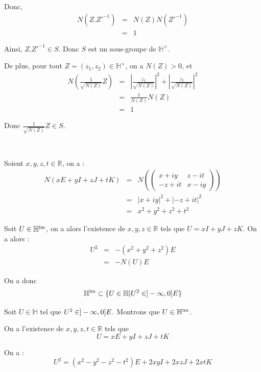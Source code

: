 Donc,
\begin{eqnarray*}
  N \left( {Z.Z'}^{- 1} \right) & = & N (Z) N \left( {Z'}^{- 1} \right)\\
  & = & 1
\end{eqnarray*}


Ainsi, ${Z.Z'}^{- 1} \in S$. Donc $S$ est un sous-groupe de
$\mathbb{H}^{\times}$.

De plus, pour tout $Z = (z_1, z_2) \in \mathbb{H}^{\times}$, on a $N (Z) > 0$,
et
\begin{eqnarray*}
  N \left( \frac{1}{\sqrt{N (Z)}} Z \right) & = & \left| \frac{z_1}{\sqrt{N
  (Z)}} \right|^2 + \left| \frac{z_2}{\sqrt{N (Z)}} \right|^2\\
  & = & \frac{1}{N (Z)} N (Z)\\
  & = & 1
\end{eqnarray*}


Donc $\frac{1}{\sqrt{N (Z)}} Z \in S$.

\

 Soient $x, y, z, t \in \mathbb{R}$, on a :
\begin{eqnarray*}
  N (x E + y I + z J + t K) & = & N \left( \left(\begin{array}{cc}
    x + i y & z - i t\\
    - z + i t & x - i y
  \end{array}\right) \right)\\
  & = & | x + i y |^2 + | - z + i t |^2\\
  & = & x^2 + y^2 + z^2 + t^2
\end{eqnarray*}


 Soit $U \in \mathbb{H}^{\operatorname{im}}$, on a alors l'existence de
$x, y, z \in \mathbb{R}$ tels que $U = x I + y J + z K$. On a alors :
\begin{eqnarray*}
  U^2 & = & - (x^2 + y^2 + z^2) E\\
  & = & - N (U) E
\end{eqnarray*}


On a donc
\[ \mathbb{H}^{\operatorname{im}} \subset \{  U \in \mathbb{H} | U^2 \in] -
   \infty, 0] E \} \]


Soit $U \in \mathbb{H}$ tel que $  U^2 \in] - \infty, 0]
E$. Montrons que $U \in \mathbb{H}^{\operatorname{im}}$.

On a l'existence de $x, y, z, t \in \mathbb{R}$ tels que
\[ U = x E + y I + z J + t K \]


On a :
\[ U^2 = (x^2 - y^2 - z^2 - t^2) E + 2 x y I + 2 x z J + 2 x t K \]


